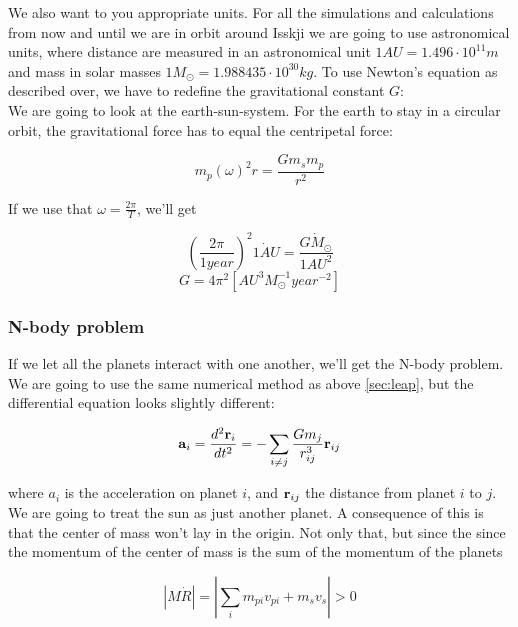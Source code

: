\documentclass[a4paper, 10pt]{article}
\begin{document}
We also want to you appropriate units. For all the simulations and calculations from now and until we are in orbit around Isskji we are going to use astronomical units, where distance are measured in an astronomical unit $1 AU = 1.496 \cdot 10^{11} m$ and mass in solar masses $1 M_{\odot} = 1.988435 \cdot 10^{30} kg$. To use Newton's equation as described over, we have to redefine the gravitational constant $G$: \\

We are going to look at the earth-sun-system. For the earth to stay in a circular orbit, the gravitational force has to equal the centripetal force:

\begin{equation}
m_p(\omega)^{2}r = \frac{Gm_sm_p}{r^{2}}
\end{equation}

If we use that $\omega = \frac{2 \pi}{T}$, we'll get

\begin{equation}
\left( \frac{2 \pi}{1 year} \right)^{2} \dot {1 AU} = \frac{G \dot M_{\odot}}{1AU^{2}} 
\end{equation}
\begin{equation}
G = 4 \pi^{2}[AU^{3} M_{\odot}^{-1} year^{-2}]
\end{equation}

\subsubsection{N-body problem}
If we let all the planets interact with one another, we'll get the N-body problem. We are going to use the same numerical method as above \ref{sec:leap}, but the differential equation looks slightly different:

\begin{align}
\bold{a}_i = \frac{d^{2}\textbf{r}_i}{dt^{2}}  = -\sum_{i \neq j}\frac{G m_j}{r_{ij}^{3}}\textbf{r}_{ij}
\end{align}

where $a_i$ is the acceleration on planet $i$, and $\bold{r}_{ij}$ the distance from planet $i$ to $j$. We are going to treat the sun as just another planet. A consequence of this is that the center of mass won't lay in the origin. Not only that, but since the since the momentum of the center of mass is the sum of the momentum of the planets 

\begin{equation}
|M\dot{R}| = |\sum\limits_i m_{pi}v_{pi} + m_sv_s| > 0 
\end{equation}
\end{document}
